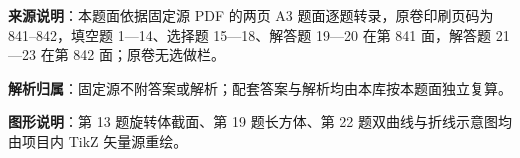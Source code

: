 

\begin{gknotice}
\textbf{来源说明}：本题面依据固定源 PDF 的两页 A3 题面逐题转录，原卷印刷页码为 841–842，填空题 1—14、选择题 15—18、解答题 19—20 在第 841 面，解答题 21—23 在第 842 面；原卷无选做栏。

\textbf{解析归属}：固定源不附答案或解析；配套答案与解析均由本库按本题面独立复算。

\textbf{图形说明}：第 13 题旋转体截面、第 19 题长方体、第 22 题双曲线与折线示意图均由项目内 TikZ 矢量源重绘。
\end{gknotice}



